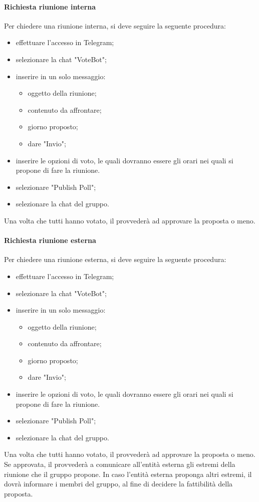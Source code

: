  \paragraph{Richiesta riunione interna}
 Per chiedere una riunione interna, si deve seguire la seguente procedura:
 \begin{itemize}
 	\item effettuare l'accesso in Telegram;
 	\item selezionare la chat "VoteBot";
 	\item inserire in un solo messaggio:
 	\begin{itemize}
 		\item oggetto della riunione;
 		\item contenuto da affrontare;
	 	\item giorno proposto;
	 	\item dare "Invio";
 	\end{itemize}
 	\item inserire le opzioni di voto, le quali dovranno essere gli orari nei quali si propone di fare la riunione.
 	\item selezionare "Publish Poll";
 	\item selezionare la chat del gruppo.
 \end{itemize}
 Una volta che tutti hanno votato, il \RESP{} provvederà ad approvare la proposta o meno.
 \paragraph{Richiesta riunione esterna}
 Per chiedere una riunione esterna, si deve seguire la seguente procedura:
 \begin{itemize}
 	\item effettuare l'accesso in Telegram;
 	\item selezionare la chat "VoteBot";
 	\item inserire in un solo messaggio:
 	\begin{itemize}
 		\item oggetto della riunione;
 		\item contenuto da affrontare;
 		\item giorno proposto;
 		\item dare "Invio";
 	\end{itemize}
 	\item inserire le opzioni di voto, le quali dovranno essere gli orari nei quali si propone di fare la riunione.
 	\item selezionare "Publish Poll";
 	\item selezionare la chat del gruppo.
 \end{itemize}
 Una volta che tutti hanno votato, il \RESP{} provvederà ad approvare la proposta o meno. \\
 Se approvata, il \RESP{} provvederà a comunicare all'entità esterna gli estremi della riunione che il gruppo propone. In caso l'entità esterna proponga altri estremi, il \RESP{} dovrà informare i membri del gruppo, al fine di decidere la fattibilità della proposta. 
